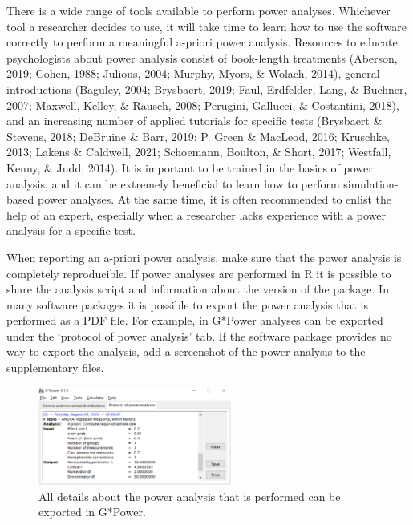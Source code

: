 \documentclass[
  english,
  ,jou,floatsintext]{apa6}
\begin{document}
There is a wide range of tools available to perform power analyses. Whichever tool a researcher decides to use, it will take time to learn how to use the software correctly to perform a meaningful a-priori power analysis. Resources to educate psychologists about power analysis consist of book-length treatments (Aberson, 2019; Cohen, 1988; Julious, 2004; Murphy, Myors, \& Wolach, 2014), general introductions (Baguley, 2004; Brysbaert, 2019; Faul, Erdfelder, Lang, \& Buchner, 2007; Maxwell, Kelley, \& Rausch, 2008; Perugini, Gallucci, \& Costantini, 2018), and an increasing number of applied tutorials for specific tests (Brysbaert \& Stevens, 2018; DeBruine \& Barr, 2019; P. Green \& MacLeod, 2016; Kruschke, 2013; Lakens \& Caldwell, 2021; Schoemann, Boulton, \& Short, 2017; Westfall, Kenny, \& Judd, 2014). It is important to be trained in the basics of power analysis, and it can be extremely beneficial to learn how to perform simulation-based power analyses. At the same time, it is often recommended to enlist the help of an expert, especially when a researcher lacks experience with a power analysis for a specific test.

When reporting an a-priori power analysis, make sure that the power analysis is completely reproducible. If power analyses are performed in R it is possible to share the analysis script and information about the version of the package. In many software packages it is possible to export the power analysis that is performed as a PDF file. For example, in G*Power analyses can be exported under the `protocol of power analysis' tab. If the software package provides no way to export the analysis, add a screenshot of the power analysis to the supplementary files.

\begin{figure}
\includegraphics[width=240px]{images/gpowprotocol} \caption{All details about the power analysis that is performed can be exported in G*Power.}\label{fig:gpowprotocol}
\end{figure}
\end{document}
